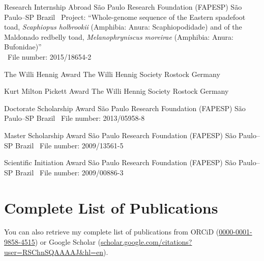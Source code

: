 \documentclass[11pt, letterpaper, sans]{moderncv}
\begin{document}
	{Research Internship Abroad}
	{São Paulo Research Foundation (FAPESP)}
	{São Paulo--SP}
	{Brazil}
	{
		\textbullet~Project: ``Whole-genome sequence of the Eastern spadefoot toad, \textit{Scaphiopus holbrookii} (Amphibia: Anura: Scaphiopodidade) and of the Maldonado redbelly toad, \textit{Melanophryniscus moreirae} (Amphibia: Anura: Bufonidae)''\\
		\textbullet~File number: 2015/18654-2
	}

	{The Willi Hennig Award}
	{The Willi Hennig Society}
	{Rostock}
	{Germany}
	{}

\cventry{---}
	{Kurt Milton Pickett Award}
	{The Willi Hennig Society}
	{Rostock}
	{Germany}
	{}

	{Doctorate Scholarship Award}
	{São Paulo Research Foundation (FAPESP)}
	{São Paulo--SP}
	{Brazil}
	{
		\textbullet~File number: 2013/05958-8
	}

	{Master Scholarship Award}
	{São Paulo Research Foundation (FAPESP)}
	{São Paulo--SP}
	{Brazil}
	{
		\textbullet~File number: 2009/13561-5
	}

	{Scientific Initiation Award}
	{São Paulo Research Foundation (FAPESP)}
	{São Paulo--SP}
	{Brazil}
	{
		\textbullet~File number: 2009/00886-3
	}


\section{Complete List of Publications}

You can also retrieve my complete list of publications from ORCiD (\href{https://orcid.org/0000-0001-9858-4515}{0000-0001-9858-4515}) or Google Scholar (\href{https://scholar.google.com/citations?user=RSChnSQAAAAJ\&hl=en}{scholar.google.com/citations?user=RSChnSQAAAAJ\&hl=en}).



% 
% 
% 
\end{document}
